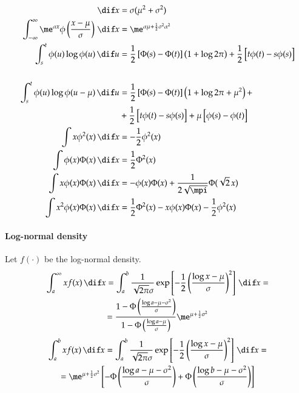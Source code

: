 \documentclass[a4paper]{article}
\numberwithin{equation}{subsection}
\begin{document}
\begin{align}
  \dif x 
  &= 
  \sigma ( \mu^2 + \sigma^2) \\
  \int_{-\infty}^\infty \me^{\alpha x} 
  \phi \left( \frac{x-\mu}{\sigma} \right) \,\dif x 
  &= 
  \me^{\alpha \mu + \frac{1}{2} \sigma^2 \alpha^2} \\
  \int_s^t \phi(u) \log\phi(u) \,\dif u 
  &=
  \frac{1}{2}\left[ \Phi(s) - \Phi(t)\right] \left(1+\log 2\pi \right)
  + \frac{1}{2}\left[ t\phi(t) - s\phi(s)\right] 
  \nonumber\\
  &\\
  \int_s^t \phi(u) \log\phi(u - \mu) \,\dif u 
  &=
  \frac{1}{2}\left[ \Phi(s) - \Phi(t)\right]
  \left( 1 + \log 2\pi + \mu^2 \right) + 
  \nonumber\\
  & + \frac{1}{2}\left[ t\phi(t) - s\phi(s)\right] +
  \mu \left[ \phi(s) - \phi(t) \right]\\
  \int x \phi^2(x) \,\dif x
  &=
  -\frac{1}{2} \phi^2(x)\\
  \int \phi(x) \Phi(x) \,\dif x
  &=
  \frac{1}{2} \Phi^2(x)\\
  \int x \phi(x) \Phi(x) \,\dif x
  &=
  -\phi(x) \Phi(x) + \frac{1}{2\sqrt{\mpi}} \Phi(\sqrt{2}\,x)\\
  \int x^2 \phi(x) \Phi(x) \,\dif x
  &=
  \frac{1}{2} \Phi^2(x)
  -x \phi(x) \Phi(x)
  -\frac{1}{2} \phi^2(x)
\end{align}


\paragraph{Log-normal density}

Let $f(\cdot)$ be the log-normal density.
\begin{multline}
\int_a^\infty x f(x) \,\dif x
  =
  \int_a^b
  \frac{1}{\sqrt{2\pi}\sigma}
  \exp\left[
    -\frac{1}{2}
    \left(
      \frac{\log x - \mu}{\sigma}
    \right)^2
  \right]
  \,\dif x
  =
  \\
  =
  \frac{1 - \Phi \left(
      \frac{\log a - \mu - \sigma^2}{\sigma}
      \right)}
    {1 - \Phi \left(
      \frac{\log a - \mu}{\sigma}
      \right)}
    \me^{\mu + \frac{1}{2}\sigma^2} 
\end{multline}
\begin{multline}
  \int_a^b x f(x) \,\dif x
  =
  \int_a^b
  \frac{1}{\sqrt{2\pi}\sigma}
  \exp\left[
    -\frac{1}{2}
    \left(
      \frac{\log x - \mu}{\sigma}
    \right)^2
  \right]
  \,\dif x
  =
  \\
  =
  \me^{\mu + \frac{1}{2}\sigma^2}
  \left[
    -\Phi \left(
      \frac{\log a - \mu - \sigma^2}{\sigma}
    \right)
    +\Phi \left(
      \frac{\log b - \mu - \sigma^2}{\sigma}
    \right)
  \right]
\end{multline}
\end{document}
